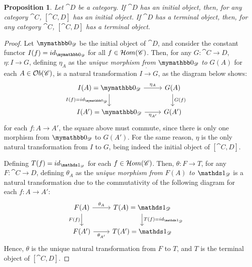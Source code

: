 \documentclass[a4paper, twoside,openright]{report}
\theoremstyle{plain}
\newtheorem{prop}[theorem]{Proposition}
\theoremstyle{definition}
\begin{document}
\begin{prop}
    Let $\cat D$ be a category. If $\cat D$ has an initial object, then, for any category $\cat C$, $[\cat{C, D}]$ has an initial object. If $\cat D$ has a terminal object, then, for any category $\cat C$, $[\cat{C, D}]$ has a terminal object.
\end{prop}

\begin{proof}
    Let $\initial_{\cat{D}}$ be the initial object of $\cat D$,  and consider the constant functor $I(f) = id_{\initial_{\cat D}}$ for all $f \in \mathcal{H}om(\mathscr{C})$. Then, for any $G: \cat{C \rightarrow D}$, $\eta: I \rightarrow G$, defining $\eta_A$ as the \emph{unique morphism from $\initial_{\cat D}$ to $G(A)$} for each $A \in \mathcal{O}b(\mathscr{C})$, is a natural transformation $I \dot\rightarrow G$, as the diagram below shows:
    \[
        \begin{tikzcd}
            I(A)=\initial_{\cat D} 
                    \arrow[r, "{\eta_A}"]
                    \arrow[d, "{I(f) = id_{\initial_{\cat D}}}" swap] &
            G(A)
                    \arrow[d, "G(f)"] \\
            I(A') = \initial_{\cat D}
                    \arrow[r, "{\eta_{A'}}" swap] &
            G(A')
        \end{tikzcd}
    \]
    for each $f: A \rightarrow A'$, the square above must commute, since there is only one morphism from $\initial_{\cat D}$ to $G(A')$. For the same reason, $\eta$ is the only natural transformation from $I$ to $G$, being indeed the initial object of $[\cat{C, D}]$.
    
    Defining $T(f) = id_{\terminal_{\cat D}}$ for each $f \in \mathcal{H}om(\mathscr{C})$. Then, $\theta:F\rightarrow T$, for any $F: \cat{C \rightarrow D}$, defining $\theta_A$ as the \emph{unique morphism from $F(A)$ to $\terminal_{\cat{D}}$} is a natural transformation due to the commutativity of the following diagram for each $f: A \rightarrow A'$:
    \[
        \begin{tikzcd}
            F(A) \arrow[r, "{\theta_A}"] \arrow[d, "F(f)" swap] &
            T(A) = \terminal_{\cat D} \arrow[d, "{T(f) = id_{\terminal_{\cat D}}}"] \\
            F(A') \arrow[r, "{\theta_{A'}}" swap] & T(A') = \terminal_{\cat D}
        \end{tikzcd}
    \]
    Hence, $\theta$ is the unique natural transformation from $F$ to $T$, and $T$ is the terminal object of $[\cat{C, D}]$.
\end{proof}
\end{document}
